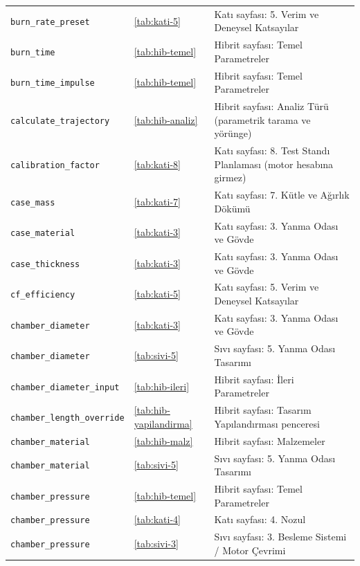 \documentclass[11pt,a4paper]{article}
\begin{document}
{\begin{longtable}{@{}>{\raggedright\arraybackslash}p{5.2cm}p{1.4cm}>{\raggedright\arraybackslash}p{7.4cm}@{}}
\texttt{burn\_\allowbreak{}rate\_\allowbreak{}preset} & \ref{tab:kati-5} & Katı sayfası: 5. Verim ve Deneysel Katsayılar \\
\texttt{burn\_\allowbreak{}time} & \ref{tab:hib-temel} & Hibrit sayfası: Temel Parametreler \\
\texttt{burn\_\allowbreak{}time\_\allowbreak{}impulse} & \ref{tab:hib-temel} & Hibrit sayfası: Temel Parametreler \\
\texttt{calculate\_\allowbreak{}trajectory} & \ref{tab:hib-analiz} & Hibrit sayfası: Analiz Türü (parametrik tarama ve yörünge) \\
\texttt{calibration\_\allowbreak{}factor} & \ref{tab:kati-8} & Katı sayfası: 8. Test Standı Planlaması (motor hesabına girmez) \\
\texttt{case\_\allowbreak{}mass} & \ref{tab:kati-7} & Katı sayfası: 7. Kütle ve Ağırlık Dökümü \\
\texttt{case\_\allowbreak{}material} & \ref{tab:kati-3} & Katı sayfası: 3. Yanma Odası ve Gövde \\
\texttt{case\_\allowbreak{}thickness} & \ref{tab:kati-3} & Katı sayfası: 3. Yanma Odası ve Gövde \\
\texttt{cf\_\allowbreak{}efficiency} & \ref{tab:kati-5} & Katı sayfası: 5. Verim ve Deneysel Katsayılar \\
\texttt{chamber\_\allowbreak{}diameter} & \ref{tab:kati-3} & Katı sayfası: 3. Yanma Odası ve Gövde \\
\texttt{chamber\_\allowbreak{}diameter} & \ref{tab:sivi-5} & Sıvı sayfası: 5. Yanma Odası Tasarımı \\
\texttt{chamber\_\allowbreak{}diameter\_\allowbreak{}input} & \ref{tab:hib-ileri} & Hibrit sayfası: İleri Parametreler \\
\texttt{chamber\_\allowbreak{}length\_\allowbreak{}override} & \ref{tab:hib-yapilandirma} & Hibrit sayfası: Tasarım Yapılandırması penceresi \\
\texttt{chamber\_\allowbreak{}material} & \ref{tab:hib-malz} & Hibrit sayfası: Malzemeler \\
\texttt{chamber\_\allowbreak{}material} & \ref{tab:sivi-5} & Sıvı sayfası: 5. Yanma Odası Tasarımı \\
\texttt{chamber\_\allowbreak{}pressure} & \ref{tab:hib-temel} & Hibrit sayfası: Temel Parametreler \\
\texttt{chamber\_\allowbreak{}pressure} & \ref{tab:kati-4} & Katı sayfası: 4. Nozul \\
\texttt{chamber\_\allowbreak{}pressure} & \ref{tab:sivi-3} & Sıvı sayfası: 3. Besleme Sistemi / Motor Çevrimi \\

\end{longtable}}
\end{document}
